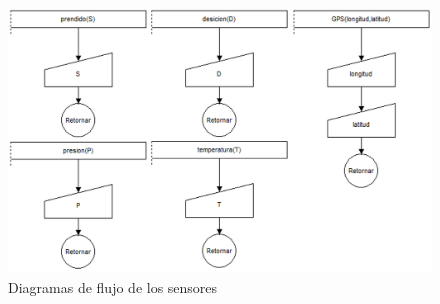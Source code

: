 \begin{figure}[H]
	\centering
	\includegraphics[width=\columnwidth]{imagenes/DFsensores}
	\caption{Diagramas de flujo de los sensores}
	\label{fig:dia_fluj7}
\end{figure}

\bigskip

\endinput 